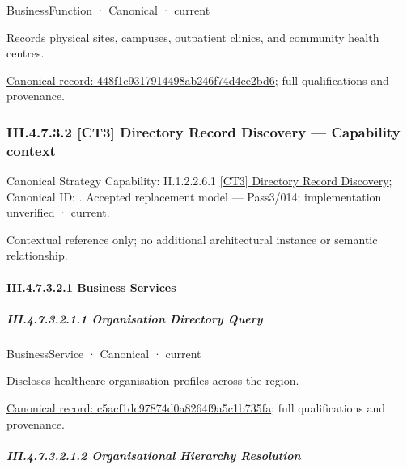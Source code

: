 \label{element:448f1c9317914498ab246f74d4ce2bd6}
{\small BusinessFunction · Canonical · current}\par

Records physical sites, campuses, outpatient clinics, and community health centres.


{\footnotesize \href{../../../../../../../../continuum/business/business-function/448f1c9317914498ab246f74d4ce2bd6.md}{Canonical record: 448f1c9317914498ab246f74d4ce2bd6}; full qualifications and provenance.}\par
\subsubsection*{III.4.7.3.2 [CT3] Directory Record Discovery — Capability context}
\label{navigation:III.4.7.3.2}

{\small Canonical Strategy Capability: II.1.2.2.6.1 \hyperref[element:2bebb37d407a4816aed79e9a13e324e9]{[CT3] Directory Record Discovery}; Canonical ID: \texttt{}. Accepted replacement model — Pass3/014; implementation unverified · current.}\par
Contextual reference only; no additional architectural instance or semantic relationship.\par
\paragraph*{III.4.7.3.2.1 Business Services}
\label{navigation:III.4.7.3.2.1}

\subparagraph*{III.4.7.3.2.1.1 Organisation Directory Query}
\label{navigation:III.4.7.3.2.1.1}

\label{element:c5acf1dc97874d0a8264f9a5c1b735fa}
{\small BusinessService · Canonical · current}\par

Discloses healthcare organisation profiles across the region.


{\footnotesize \href{../../../../../../../../continuum/business/business-service/c5acf1dc97874d0a8264f9a5c1b735fa.md}{Canonical record: c5acf1dc97874d0a8264f9a5c1b735fa}; full qualifications and provenance.}\par
\subparagraph*{III.4.7.3.2.1.2 Organisational Hierarchy Resolution}
\label{navigation:III.4.7.3.2.1.2}

